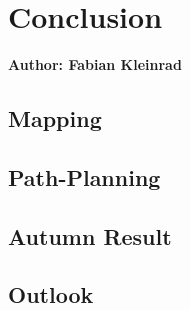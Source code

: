 \chapter{Conclusion}

\textbf{Author: Fabian Kleinrad} 

\section{Mapping}

\section{Path-Planning}

\section{Autumn Result}

\section{Outlook}

\filbreak